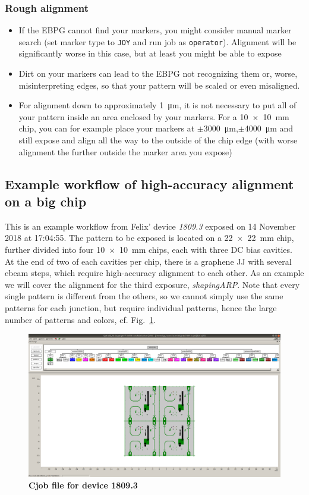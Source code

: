 \subsubsection{Rough alignment}
\begin{itemize}
	\item If the EBPG cannot find your markers, you might consider manual marker search (set marker type to \lstinline|JOY| and run job as \lstinline|operator|). 
	Alignment will be significantly worse in this case, but at least you might be able to expose
	\item Dirt on your markers can lead to the EBPG not recognizing them or, worse, misinterpreting edges, so that your pattern will be scaled or even misaligned.
	\item For alignment down to approximately \SI{1}{\micro\meter}, it is not necessary to put all of your pattern inside an area enclosed by your markers. 
	For a \SI{10x10}{\milli\meter} chip, you can for example place your markers at $\pm$\SI{3000}{\micro\meter},$\pm$\SI{4000}{\micro\meter} and still expose and align all the way to the outside of the chip edge (with worse alignment the further outside the marker area you expose)
\end{itemize}

\subsection{Example workflow of high-accuracy alignment on a big chip}
%
This is an example workflow from Felix' device \textit{1809.3} exposed on 14 November 2018 at 17:04:55.
%
The pattern to be exposed is located on a \SI{22x22}{\milli\meter} chip, further divided into four \SI{10x10}{\milli\meter} chips, each with three DC bias cavities. 
%
At the end of two of each cavities per chip, there is a graphene JJ with several ebeam steps, which require high-accuracy alignment to each other. 
%
As an example we will cover the alignment for the third exposure, \textit{shapingARP}. 
%
Note that every single pattern is different from the others, so we cannot simply use the same patterns for each junction, but require individual patterns, hence the large number of patterns and colors, cf. Fig.~\ref{fig:ebeam1}.

\begin{figure}
	\centering
	\includegraphics[width=\linewidth]{appendix/figs/ebeam1}
	\caption{
	\textbf{Cjob file for device 1809.3}
	}
	\label{fig:ebeam1}
\end{figure}


